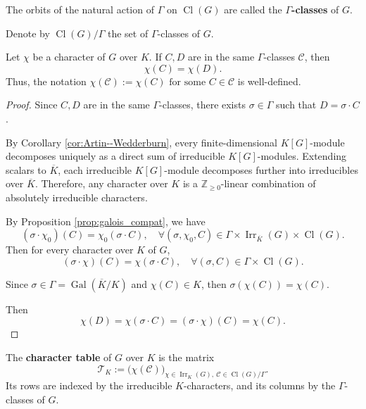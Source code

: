 \begin{defn}

The orbits of the natural action of \(\Gamma\) on \(\operatorname{Cl}(G)\) are called the \textbf{\(\Gamma\)-classes} of \(G\).

\end{defn}
\begin{notation}
Denote by  \(\operatorname{Cl}(G)/\Gamma\) the set of \(\Gamma\)-classes of \(G\).
\end{notation}
\begin{prop}
Let $\chi$ be a character of $G$ over $K$. If $C,D$ are in the same \(\Gamma\)-classes $\mathcal C$, then \[\chi(C)=\chi(D).\]
Thus, the notation \(\chi(\mathcal{C}):=\chi(C)\text{ for some } C\in \mathcal C\) is well-defined.
\end{prop}
\begin{proof}
Since $C,D$ are in the same \(\Gamma\)-classes, there exists $\sigma\in \Gamma$ such that $D=\sigma \cdot C$.

By Corollary \ref{cor:Artin--Wedderburn}, every finite-dimensional $K[G]$-module decomposes uniquely as a direct sum of irreducible $K[G]$-modules. Extending scalars to $\overline K$, each irreducible $K[G]$-module  decomposes further into irreducibles over $\overline K$. Therefore, any character over $K$ is a $\mathbb Z_{\ge 0}$-linear combination of absolutely irreducible characters.

By Proposition \ref{prop:galois_compat}, we have \[
(\sigma \cdot \chi_0)(C) = \chi_0(\sigma \cdot C),\quad\forall (\sigma,\chi_0,C)\in \Gamma\times\operatorname{Irr}_{\overline{K}}(G)\times\operatorname{Cl}(G).
\]
Then for every character over $K$ of $G$, \[
(\sigma \cdot \chi)(C) = \chi(\sigma \cdot C),\quad\forall (\sigma,C)\in \Gamma\times\operatorname{Cl}(G).
\]

Since $\sigma\in\Gamma=\operatorname{Gal}(\overline{K}/K)$ and $\chi(C)\in K$, then $\sigma(\chi(C))=\chi(C)$.

Then \[\chi(D)=\chi(\sigma\cdot C)=(\sigma\cdot \chi)(C)=\chi(C).\]
\end{proof}

\begin{defn}
\label{def:char_table_K}
The \textbf{character table} of \(G\) over \(K\) is the matrix
\[
\mathcal T_K := \bigl( \chi(\mathcal C) \bigr)_{\chi \in \operatorname{Irr}_K(G),\ \mathcal C \in \operatorname{Cl}(G)/\Gamma}.
\]
Its rows are indexed by the irreducible \(K\)-characters, and its columns by the \(\Gamma\)-classes of \(G\).
\end{defn}


